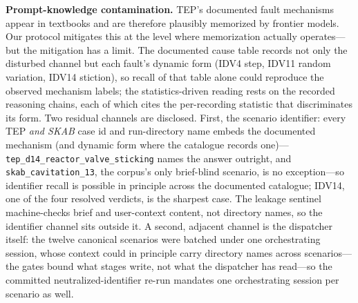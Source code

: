 \documentclass[preprint,10pt]{elsarticle}
\begin{document}
\textbf{Prompt-knowledge contamination.} TEP's documented fault mechanisms appear in textbooks and are therefore plausibly memorized by frontier models. Our protocol mitigates this at the level where memorization actually operates---but the mitigation has a limit. The documented cause table records not only the disturbed channel but each fault's dynamic form (IDV4 step, IDV11 random variation, IDV14 stiction), so recall of that table alone could reproduce the observed mechanism labels; the statistics-driven reading rests on the recorded reasoning chains, each of which cites the per-recording statistic that discriminates its form. Two residual channels are disclosed. First, the scenario identifier: every TEP \emph{and SKAB} case id and run-directory name embeds the documented mechanism (and dynamic form where the catalogue records one)---\texttt{tep\_d14\_reactor\_valve\_sticking} names the answer outright, and \texttt{skab\_cavitation\_13}, the corpus's only brief-blind scenario, is no exception---so identifier recall is possible in principle across the documented catalogue; IDV14, one of the four resolved verdicts, is the sharpest case. The leakage sentinel machine-checks brief and user-context content, not directory names, so the identifier channel sits outside it. A second, adjacent channel is the dispatcher itself: the twelve canonical scenarios were batched under one orchestrating session, whose context could in principle carry directory names across scenarios---the gates bound what stages write, not what the dispatcher has read---so the committed neutralized-identifier re-run mandates one orchestrating session per scenario as well.
\end{document}

